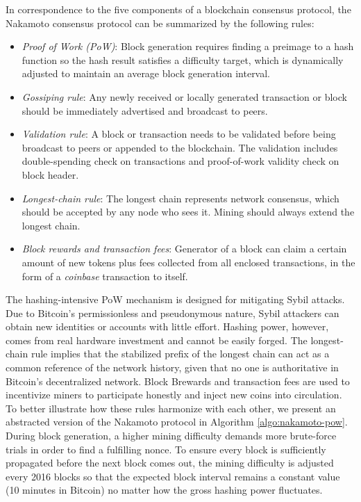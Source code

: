 In correspondence to the five components of a blockchain consensus protocol, the Nakamoto consensus protocol can be summarized by the following rules:
\begin{itemize}
    \item \emph{Proof of Work (PoW)}: Block generation requires finding a preimage to a hash function so the hash result satisfies a difficulty target, which is dynamically adjusted to maintain an average block generation interval.
    \item \emph{Gossiping rule}: Any newly received or locally generated transaction or block should be immediately advertised and broadcast to peers.
    \item \emph{Validation rule}: A block or transaction needs to be validated before being broadcast to peers or appended to the blockchain. The validation includes double-spending check on transactions and proof-of-work validity check on block header.
    \item \emph{Longest-chain rule}: The longest chain represents network consensus, which should be accepted by any node who sees it. Mining should always extend the longest chain.
    \item \emph{Block rewards and transaction fees}: Generator of a block can claim a certain amount of new tokens plus fees collected from all enclosed transactions, in the form of a \emph{coinbase} transaction to itself.
\end{itemize}
The hashing-intensive PoW mechanism is designed for mitigating Sybil attacks. Due to Bitcoin's permissionless and pseudonymous nature, Sybil attackers can obtain new identities or accounts with little effort. Hashing power, however, comes from real hardware investment and cannot be easily forged. The longest-chain rule implies that the stabilized prefix of the longest chain can act as a common reference of the network history, given that no one is authoritative in Bitcoin's decentralized network. 
Block Brewards and transaction fees are used to incentivize miners to participate honestly and inject new coins into circulation.
To better illustrate how these rules harmonize with each other, we present an abstracted version of the Nakamoto protocol in Algorithm \ref{algo:nakamoto-pow}. During block generation, a higher mining difficulty demands more brute-force trials in order to find a fulfilling nonce. To ensure every block is sufficiently propagated before the next block comes out, the mining difficulty is adjusted every 2016 blocks so that the expected block interval remains a constant value (10 minutes in Bitcoin) no matter how the gross hashing power fluctuates. 
